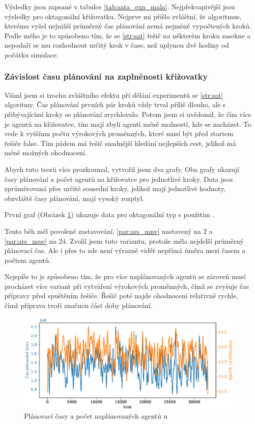 Výsledky jsou zapsané v tabulce \ref{tab:sata_exp_mala}.
Nejpřekvapivější jsou výsledky pro oktagonální křižovatku.
Nejprve mi přišlo zvláštní, že algoritmus, kterému vyšel nejnižší průměrný čas plánování nemá nejméně vypočtených kroků.
Podle mého je to způsobeno tím, že se \ref{str:sat} řešič na některém kroku zasekne a nepodaří se mu rozhodnout
určitý krok v čase, než uplynou dvě hodiny od počátku simulace.



\subsubsection{Závislost času plánování na zaplněnosti křižovatky}

Všiml jsem si trochu zvláštního efektu při dělání experimentů se \ref{str:sat} algoritmy.
Čas plánování prvních pár kroků vždy trval příliš dlouho, ale s přibývajícími kroky se plánování zrychlovalo.
Potom jsem si uvědomil, že čím více je agentů na křižovatce, tím mají zbylí agenti méně možností, kde se nacházet.
To vede k vyššímu počtu výrokových proměnných, které musí být před startem řešiče \textrm{false}.
Tím pádem má řešič snadnější hledání nejlepších cest, jelikož má méně možných ohodnocení.

Abych tuto teorii více prozkoumal, vytvořil jsem dva grafy.
Oba grafy ukazují časy plánování a počet agentů na křižovatce pro jednotlivé kroky.
Data jsou zprůměrovaná přes určité sousední kroky, jelikož mají jednotlivé hodnoty,
obzvláště časy plánování, mají vysoký rozptyl.

První graf (Obrázek \ref{fig:cas_vs_agenti_satrsg}) ukazuje data pro oktagonální typ s použitím .

Tento běh měl povolené zastavování, \ref{par:ars_mnv} nastavený na $2$ a \ref{par:ars_mpc} na $24$.
Zvolil jsem tuto variantu, protože měla nejdelší průměrný plánovací čas.
Ale i přes to zde není výrazně vidět nepřímá úměra mezi časem a počtem agentů.

Nejspíše to je způsobeno tím, že pro více naplánovaných agentů se zároveň musí procházet více variant
při vytváření výrokových proměnných, čímž se zvyšuje čas přípravy před spuštěním řešiče.
Řešič poté najde ohodnocení relativně rychle, čímž příprava tvoří značnou část doby plánování.

\begin{figure}[h]
	\centering
	\includegraphics[width=140mm]{../img/CasVsAgentiSATRSG}
	\caption{Plánovací časy a počet naplánovaných agentů u }
	\label{fig:cas_vs_agenti_satrsg}
\end{figure}

